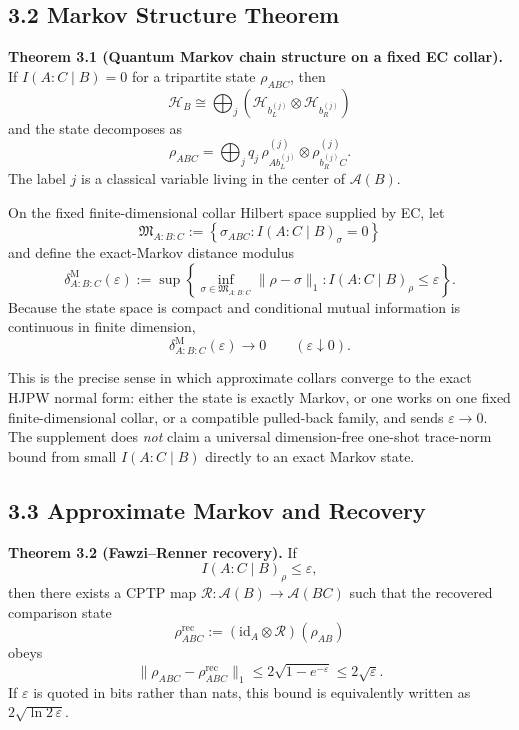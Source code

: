 \subsection{3.2 Markov Structure Theorem}\label{32-markov-structure-theorem}

\textbf{Theorem 3.1 (Quantum Markov chain structure on a fixed EC collar).} If \(I(A:C\mid B)=0\) for a tripartite state \(\rho_{ABC}\), then
\[
\mathcal H_B
\cong
\bigoplus_j
\left(
\mathcal H_{b_L^{(j)}}\otimes \mathcal H_{b_R^{(j)}}
\right)
\]
and the state decomposes as
\[
\rho_{ABC}
=
\bigoplus_j
q_j\,
\rho^{(j)}_{A b_L^{(j)}}\otimes \rho^{(j)}_{b_R^{(j)} C}.
\]
The label \(j\) is a classical variable living in the center of \(\mathcal A(B)\).

On the fixed finite-dimensional collar Hilbert space supplied by EC, let
\[
\mathfrak M_{A:B:C}
:=
\left\{
\sigma_{ABC}: I(A:C\mid B)_\sigma=0
\right\}
\]
and define the exact-Markov distance modulus
\[
\delta^{\mathrm M}_{A:B:C}(\varepsilon)
:=
\sup\left\{
\inf_{\sigma\in\mathfrak M_{A:B:C}}\|\rho-\sigma\|_1:
I(A:C\mid B)_\rho\le\varepsilon
\right\}.
\]
Because the state space is compact and conditional mutual information is continuous in finite dimension,
\[
\delta^{\mathrm M}_{A:B:C}(\varepsilon)\longrightarrow0
\qquad
(\varepsilon\downarrow0).
\]

This is the precise sense in which approximate collars converge to the exact HJPW normal form: either the state is exactly Markov, or one works on one fixed finite-dimensional collar, or a compatible pulled-back family, and sends \(\varepsilon\to0\). The supplement does \emph{not} claim a universal dimension-free one-shot trace-norm bound from small \(I(A:C\mid B)\) directly to an exact Markov state.

\subsection{3.3 Approximate Markov and Recovery}\label{33-approximate-markov-and-recovery}

\textbf{Theorem 3.2 (Fawzi--Renner recovery).} If
\[
I(A:C\mid B)_\rho\le\varepsilon,
\]
then there exists a CPTP map \(\mathcal R:\mathcal A(B)\to\mathcal A(BC)\) such that the recovered comparison state
\[
\rho^{\mathrm{rec}}_{ABC}
:=
(\mathrm{id}_A\otimes\mathcal R)(\rho_{AB})
\]
obeys
\[
\|\rho_{ABC}-\rho^{\mathrm{rec}}_{ABC}\|_1
\le
2\sqrt{1-e^{-\varepsilon}}
\le
2\sqrt{\varepsilon}.
\]
If \(\varepsilon\) is quoted in bits rather than nats, this bound is equivalently written as \(2\sqrt{\ln 2\,\varepsilon}\).

